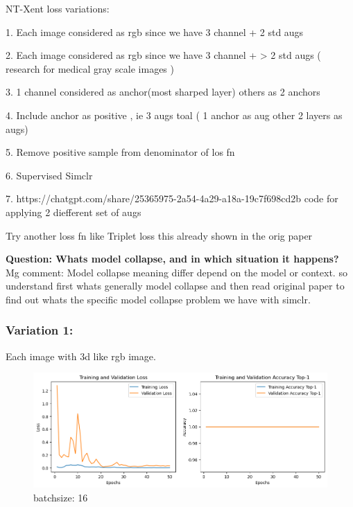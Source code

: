 \documentclass[12pt,twoside,a4paper,parskip]{scrbook} %
\begin{document}
NT-Xent loss variations:

1. Each image considered as rgb since we have 3 channel + 2 std augs

2. Each image considered as rgb since we have 3 channel + > 2 std augs ( research for medical gray scale images )

3. 1 channel considered as anchor(most sharped layer) others as 2 anchors

4. Include anchor as positive , ie 3 augs  toal ( 1 anchor as aug other 2 layers as augs)

5. Remove positive sample from denominator of los fn

6. Supervised Simclr

7. https://chatgpt.com/share/25365975-2a54-4a29-a18a-19c7f698cd2b
code for applying 2 diefferent set of augs

Try another loss fn like Triplet loss this already shown in the orig paper

\textbf{Question: Whats model collapse, and in which situation it happens?}
Mg comment: Model collapse meaning differ depend on the model or context. so understand first whats generally model collapse and then read original paper to find out whats the specific model collapse problem we have with simclr.
\subsubsection{Variation 1:}
Each image with 3d like rgb image.

\begin{figure}[H]
  \centering
  \includegraphics[width=0.9\linewidth]{image.png} %
  \caption{batchsize: 16}
  \label{fig:enter-label}
\end{figure}
\end{document}
